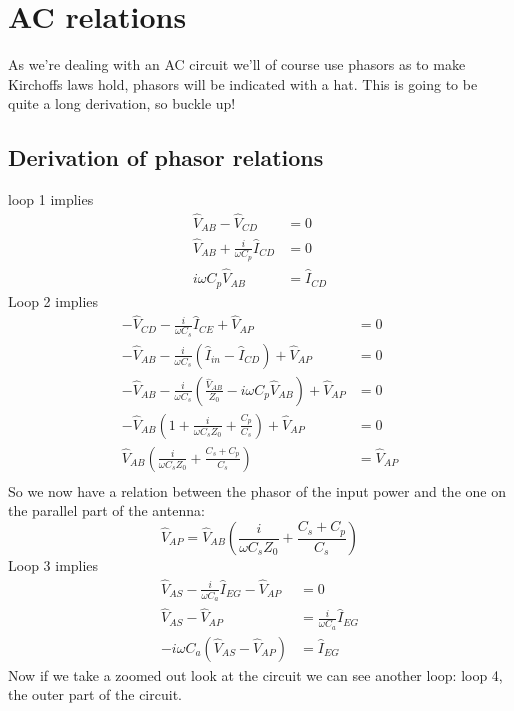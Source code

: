 \chapter{AC relations}
As we're dealing with an AC circuit we'll of course use phasors as to make Kirchoffs
laws hold, phasors will be indicated with a hat.
This is going to be quite a long derivation, so buckle up!\\
\section{Derivation of phasor relations}
loop 1 implies
\begin{eqnarray}
	\hat{V}_{AB} - \hat{V}_{CD} &= 0\\
	\hat{V}_{AB} + \frac{i}{\omega C_p} \hat{I}_{CD} &= 0\\
	i \omega C_p\hat{V}_{AB} &= \hat{I}_{CD}
\end{eqnarray}
Loop 2 implies
\begin{eqnarray}
	-\hat{V}_{CD} - 	\frac{i}{\omega C_s} \hat{I}_{CE} + \hat{V}_{AP} &= 0\\
	-\hat{V}_{AB} - 	\frac{i}{\omega C_s}(\hat{I}_{in} - \hat{I}_{CD}) + \hat{V}_{AP}&= 0\\
	-\hat{V}_{AB} - 	\frac{i}{\omega C_s}\left(\frac{\hat{V}_{AB}}{Z_0} - i\omega C_p\hat{V}_{AB}\right) + \hat{V}_{AP}&= 0\\
-\hat{V}_{AB}\left(1 + 	\frac{i}{\omega C_s Z_0} + \frac{C_p}{C_s}\right) + \hat{V}_{AP}&= 0\\
	\hat{V}_{AB}\left(\frac{i}{\omega C_s Z_0} + \frac{C_s + C_p}{C_s}\right) &= \hat{V}_{AP}\\
\end{eqnarray}
So we now have a relation between the phasor of the input power and the one on the parallel part of the antenna:
\begin{equation}
	\boxed{\hat{V}_{AP}=\hat{V}_{AB}\left(\frac{i}{\omega C_s Z_0} + \frac{C_s + C_p}{C_s}\right)} \label{eqn:APphasor}
\end{equation}
Loop 3 implies
\begin{eqnarray}
	\hat{V}_{AS} - \frac{i}{\omega C_a} \hat{I}_{EG} - \hat{V}_{AP} &= 0\\
	\hat{V}_{AS}  - \hat{V}_{AP} &= \frac{i}{\omega C_a} \hat{I}_{EG}\\
	-i\omega C_a\left( \hat{V}_{AS}  - \hat{V}_{AP}\right) &= \hat{I}_{EG}
	\label{eqn:loop3}
\end{eqnarray}
Now if we take a zoomed out look at the circuit we can see another loop: loop 4, the outer part of the circuit.
